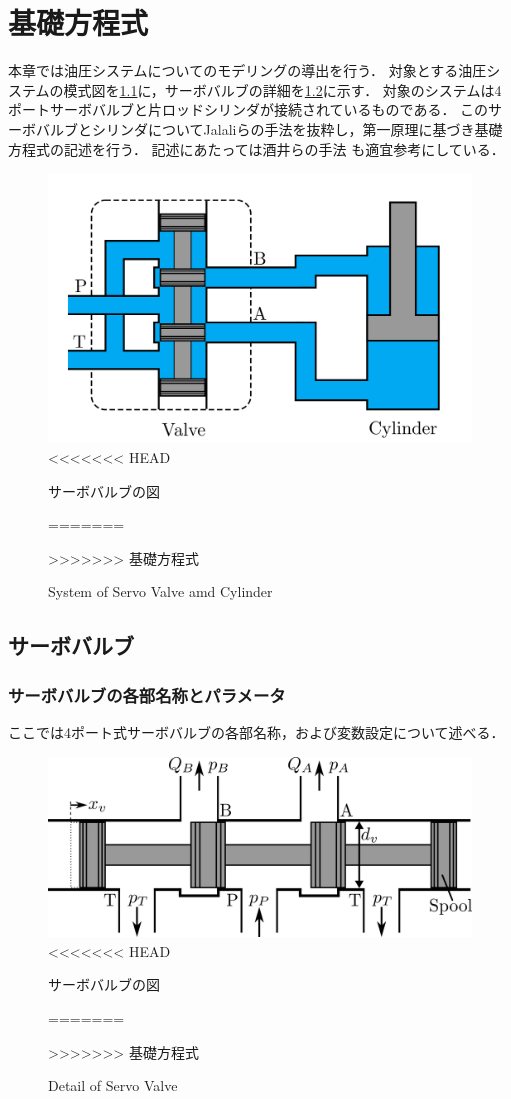 \chapter{基礎方程式}
本章では油圧システムについてのモデリングの導出を行う．
対象とする油圧システムの模式図を\figname\ref{fig:valve-cylinder}に，サーボバルブの詳細を\figname\ref{fig:valve}に示す．
対象のシステムは4ポートサーボバルブと片ロッドシリンダが接続されているものである．
このサーボバルブとシリンダについてJalaliら\cite{jelali2012hydraulic}の手法を抜粋し，第一原理に基づき基礎方程式の記述を行う．
記述にあたっては酒井らの手法\cite{前島祐三2011,前島祐三2014} も適宜参考にしている．
\begin{figure}[t]
    \centering
        \includegraphics[keepaspectratio, scale=1.0]{contents/FundamentalEquation/figure/valve-cylinder.png}
<<<<<<< HEAD
        \caption{サーボバルブの図}
        \label{fig2:valve-cylinde}
=======
        \caption{System of Servo Valve amd Cylinder}
        \label{fig:valve-cylinder}
>>>>>>> 基礎方程式
\end{figure}

\section{サーボバルブ}
\subsection{サーボバルブの各部名称とパラメータ}
ここでは4ポート式サーボバルブの各部名称，および変数設定について述べる．
\begin{figure}[t]
    \centering
        \includegraphics[keepaspectratio, scale=1.0]{contents/FundamentalEquation/figure/valve.png}
<<<<<<< HEAD
        \caption{サーボバルブの図}
        \label{fig2:valve}
=======
        \caption{Detail of Servo Valve}
        \label{fig:valve}
>>>>>>> 基礎方程式
\end{figure}
